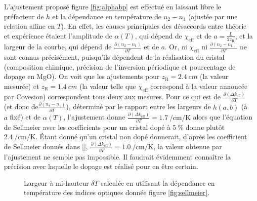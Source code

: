 \documentclass[11pt,a4paper]{article}
\newcommand{\ncite}[1]{[\citenum{#1}]}
\newcommand{\pdv}[2]{\frac{\partial #1}{\partial #2}}
\newcommand{\zr}{z_\mathsc{R}}
\newcommand{\chie}{\chi_\mathsc{eff}}
\newcommand{\dke}{\Delta k_\mathsc{eff}}
\newcommand{\mathsc}[1]{\mathrm{\scriptscriptstyle {#1}}}
\begin{document}
L'ajustement proposé figure \ref{fig:alphabp} est effectué en laissant libre le préfacteur de $h$ et la dépendance en température de $n_2 - n_1$ (ajustée par une relation affine en $T$). En effet, les causes principales des désaccords entre théorie et expérience étaient l'amplitude de $\alpha(T)$, qui dépend de $\chie$ et de $a=\frac{L}{2\zr}$, et la largeur de la courbe, qui dépend de $\pdv{\left(n_2-n_1\right)}{T}$ et de $a$. Or, ni $\chie$ ni $\pdv{\left(n_2-n_1\right)}{T}$ ne sont connus précisément, puisqu'ils dépendent de la réalisation du cristal (composition chimique, précision de l'inversion périodique et pourcentage de dopage en MgO). 
On voit que les ajustements pour $\zr=\SI{2.4}{cm}$ (la valeur mesurée) et $\zr=\SI{1.4}{cm}$ (la valeur telle que $\chie$ correspond à la valeur annoncée par Covesion) correspondent tous deux aux mesures. 
Pour ce qui est de $\pdv{\left(\dke\right)}{T}$ (et donc de$\pdv{\left(n_2-n_1\right)}{T}$), déterminé par le rapport entre les largeurs de $h(a,b)$ (à $a$ fixé) et de $\alpha(T)$, l'ajustement donne $\pdv{\left(\dke\right)}{T}=\SI{1.7}{\per\centi\meter\per\kelvin}$ %
alors que l'équation de Sellmeier avec les coefficients pour un cristal dopé à $\SI{5}{\percent}$ donne plutôt $\SI{2.4}{\per\centi\meter\per\kelvin}$. Étant donné qu'un cristal non dopé donnerait, d'après les coefficient de Sellmeier donnés dans \ncite{covesion}, $\pdv{\left(\dke\right)}{T}=\SI{1.0}{\per\centi\meter\per\kelvin}$, la valeur obtenue par l'ajustement ne semble pas impossible. Il faudrait évidemment connaître la précision avec laquelle le dopage est réalisé pour en être certain. 



\begin{figure}[htpb] 
\centering
	\small
	
	\vspace{-0.42cm}
	\caption{Largeur à mi-hauteur $\delta T$ calculée en utilisant la dépendance en température des indices optiques donnée figure \ref{fig:sellmeier}.}
	\label{fig:fwhm}
\end{figure}
\end{document}
